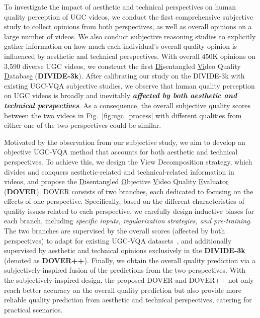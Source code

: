 \documentclass[10pt,twocolumn,letterpaper]{article}
\begin{document}
To investigate the impact of aesthetic and technical perspectives on human quality perception of UGC videos, we conduct the first comprehensive subjective study to collect opinions from both perspectives, as well as overall opinions on a large number of videos. 
We also conduct subjective reasoning studies to explicitly gather information on how much each individual's overall quality opinion is influenced by aesthetic and technical perspectives. With overall 450K opinions on 3,590 diverse UGC videos, we construct the first \underline{Di}sentangled \underline{Vi}deo Quality \underline{D}atabas\underline{e} (\textbf{DIVIDE-3k}). After calibrating our study on the DIVIDE-3k with existing UGC-VQA subjective studies, we observe that human quality perception on UGC videos is broadly and inevitably \textit{\textbf{affected by both aesthetic and technical perspectives}}. As a consequence, the overall subjective quality scores between the two videos in Fig.~\ref{fig:ugc_process} with different qualities from either one of the two perspectives could be similar.

















Motivated by the observation from our subjective study, we aim to develop an objective UGC-VQA method that accounts for both aesthetic and technical perspectives. To achieve this, we design the View Decomposition strategy, which divides and conquers aesthetic-related and technical-related information in videos, and propose the \underline{D}isentangled \underline{O}bjective \underline{V}ideo Quality \underline{E}valuato\underline{r} (\textbf{DOVER}).  DOVER consists of two branches, each dedicated to focusing on the effects of one perspective. Specifically, based on the different characteristics of quality issues related to each perspective, we carefully design inductive biases for each branch, including \textit{specific inputs, regularization strategies, and pre-training}. The two branches are supervised by the overall scores (affected by both perspectives) to adapt for existing UGC-VQA datasets~\cite{vqc,kv1k,pvq,cvd,qualcomm,ytugc}, and additionally supervised by aesthetic and technical opinions exclusively in the \textbf{DIVIDE-3k} (denoted as \textbf{DOVER++}). Finally, we obtain the overall quality prediction via a subjectively-inspired fusion of the predictions from the two perspectives. With the subjectively-inspired design, the proposed DOVER and DOVER++ not only reach better accuracy on the overall quality prediction but also provide more reliable quality prediction from aesthetic and technical perspectives, catering for practical scenarios.
\end{document}
